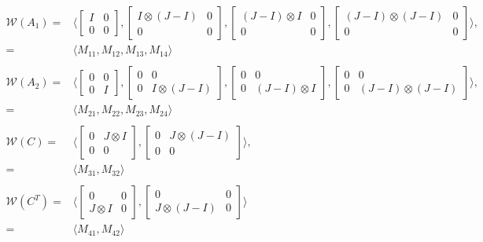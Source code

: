 \documentclass{article}
\begin{document}
\begin{align*}
    \mathcal{W}(A_1) = &\langle \begin{bmatrix}
        I & 0 \\
        0 & 0
    \end{bmatrix},
    \begin{bmatrix}
        I \otimes (J-I) & 0 \\
        0 & 0
    \end{bmatrix},
    \begin{bmatrix}
        (J-I) \otimes I & 0 \\
        0 & 0
    \end{bmatrix},
    \begin{bmatrix}
        (J-I) \otimes (J-I) & 0 \\
        0 & 0
    \end{bmatrix}
    \rangle, \\ 
    =&\langle M_{11}, M_{12}, M_{13}, M_{14} \rangle \\ \\
    \mathcal{W}(A_2) = &\langle \begin{bmatrix}
        0 & 0 \\
        0 & I
    \end{bmatrix},
    \begin{bmatrix}
        0 & 0 \\
        0 & I \otimes (J-I)
    \end{bmatrix},
    \begin{bmatrix}
        0 & 0 \\
        0 & (J-I) \otimes I
    \end{bmatrix},
    \begin{bmatrix}
        0 & 0 \\
        0 & (J-I) \otimes (J-I)
    \end{bmatrix}
    \rangle, \\
    =&\langle M_{21}, M_{22}, M_{23}, M_{24}\rangle \\ \\
    \mathcal{W}(C) = &\langle \begin{bmatrix}
        0 & J\otimes I \\
        0 & 0
    \end{bmatrix},
    \begin{bmatrix}
        0 & J\otimes (J-I) \\
        0 & 0
    \end{bmatrix}
    \rangle, \\
    =&\langle M_{31}, M_{32} \rangle \\ \\
    \mathcal{W}(C^T) = &\langle \begin{bmatrix}
        0 & 0 \\
        J\otimes I & 0
    \end{bmatrix},
    \begin{bmatrix}
        0 & 0 \\
        J\otimes (J-I) & 0
    \end{bmatrix}
    \rangle \\
    =&\langle M_{41}, M_{42}\rangle
\end{align*}
\end{document}
